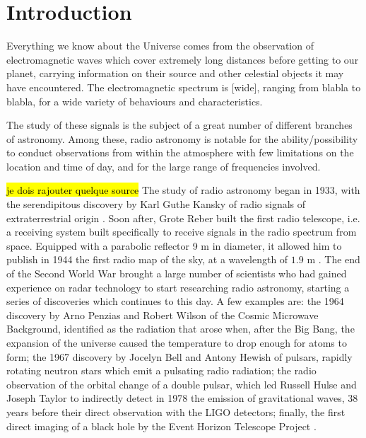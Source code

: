 \section{Introduction}
Everything we know about the Universe comes from the observation of electromagnetic waves which cover extremely long distances before getting to our planet, carrying information on their source and other celestial objects it may have encountered.
The electromagnetic spectrum is [wide], ranging from blabla to blabla, for a wide variety of behaviours and characteristics.

The study of these signals is the subject of a great number of different branches of astronomy. Among these, radio astronomy is notable for the ability/possibility to conduct observations from within the atmosphere with few limitations on the location and time of day, and for the large range of frequencies involved.

\hl{je dois rajouter quelque source} The study of radio astronomy began in 1933, with the serendipitous discovery by Karl Guthe Kansky of radio signals of extraterrestrial origin \cite{condon_essential_2016}. 
Soon after, Grote Reber built the first radio telescope, i.e. a receiving system built specifically to receive signals in the radio spectrum from space. Equipped with a parabolic reflector 9 m in diameter, it allowed him to publish in 1944 the first radio map of the sky, at a wavelength of $1.9$ m \cite{lauterbach_radio_2022}.
The end of the Second World War brought a large number of scientists who had gained experience on radar technology to start researching radio astronomy, starting a series of discoveries which continues to this day.
A few examples are: 
the 1964 discovery by Arno Penzias and Robert Wilson of the Cosmic Microwave Background, identified as the radiation that arose when, after the Big Bang, the expansion of the universe caused the temperature to drop enough for atoms to form;
the 1967 discovery by Jocelyn Bell and Antony Hewish of pulsars, rapidly rotating neutron stars which emit a pulsating radio radiation; 
the radio observation of the orbital change of a double pulsar, which led Russell Hulse and Joseph Taylor to indirectly detect in 1978 the emission of gravitational waves, 38 years before their direct observation with the LIGO detectors;
finally, the first direct imaging of a black hole by the Event Horizon Telescope Project \cite{the_event_horizon_telescope_collaboration_first_2019}.

